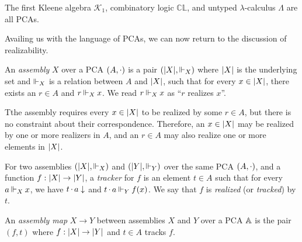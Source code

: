 \begin{fact}
    The first Kleene algebra \(\mathcal{K}_1\), combinatory logic \(\mathbb{CL}\), and untyped \(\lambda\)-calculus \(\Lambda\) are all PCAs.
\end{fact}

Availing us with the language of PCAs, we can now return to the discussion of realizability.

\begin{definition}[Assembly]
    An \emph{assembly} \(X\) over a PCA \((A, \mathop\cdot\nolimits)\) is a pair \((\vert X \vert, \mathbin\Vdash_{X})\) where \(\vert X \vert\) is the underlying set and \(\mathbin\Vdash_X\) is a relation between \(A\) and \(\vert X \vert\), such that for every \(x \in \vert X \vert\), there exists an \(r \in A\) and \(r \mathbin\Vdash_X x\).  We read \(r \mathbin\Vdash_X x\) as ``\(r\) realizes \(x\)''.
\end{definition}

    
Tthe assembly requires every \(x \in \vert X \vert\) to be realized by some \(r \in A\), but there is no constraint about their correspondence.  Therefore, an \(x \in \vert X \vert\) may be realized by one or more realizers in \(A\), and an \(r \in A\) may also realize one or more elements in \(\vert X \vert\).

\begin{definition}[Tracker]
   For two assemblies \((\vert X \vert, \mathbin\Vdash_{X})\) and \((\vert Y \vert, \mathbin\Vdash_{Y})\) over the same PCA \((A, \mathop\cdot\nolimits)\), and a function \(f : \vert X \vert \rightarrow \vert Y \vert\), a \emph{tracker} for \(f\) is an element \(t \in A\) such that for every \(a \mathbin\Vdash_X x\), we have \(t \mathop\cdot\nolimits a \downarrow\) and \(t \mathop\cdot\nolimits a \mathbin\Vdash_Y f(x)\).  We say that \(f\) is \emph{realized} (or \emph{tracked}) by \(t\).
\end{definition}

\begin{definition}
    An \emph{assembly map} \(X \rightarrow Y\) between assemblies \(X\) and \(Y\) over a PCA \(\mathbb{A}\) is the pair \((f, t)\) where \(f : \vert X \vert \rightarrow \vert Y \vert\) and \(t \in A\) tracks \(f\).
\end{definition}

